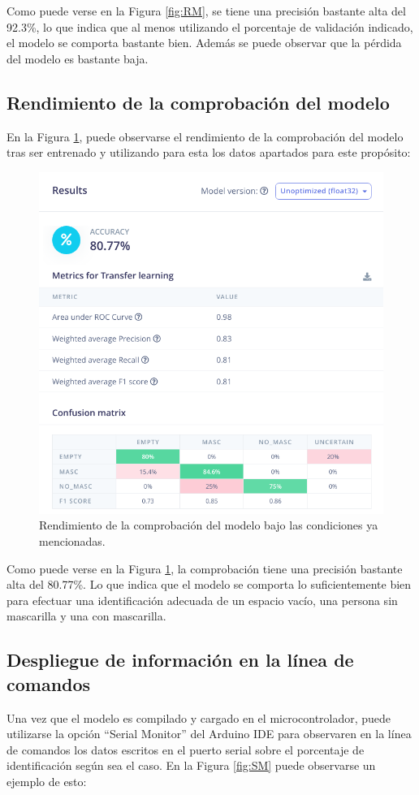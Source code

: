 Como puede verse en la Figura \ref{fig:RM}, se tiene una precisión bastante alta del 92.3\%, lo que indica que al menos utilizando el porcentaje de validación indicado, el modelo se comporta bastante bien. Además se puede observar que la pérdida del modelo es bastante baja. 

\subsection{Rendimiento de la comprobación del modelo}
En la Figura \ref{fig:TM}, puede observarse el rendimiento de la comprobación del modelo tras ser entrenado y utilizando para esta los datos apartados para este propósito: 

\begin{figure}[H]
\centering
\includegraphics[width=120mm]{./Figuras/Desarrollo_Analisis/TM}
\caption{Rendimiento de la comprobación del modelo bajo las condiciones ya mencionadas.} 
\label{fig:TM}
\end{figure}

Como puede verse en la Figura \ref{fig:TM}, la comprobación tiene una precisión bastante alta del 80.77\%. Lo que indica que el modelo se comporta lo suficientemente bien para efectuar una identificación adecuada de un espacio vacío, una persona sin mascarilla y una con mascarilla. 

\subsection{Despliegue de información en la línea de comandos}
Una vez que el modelo es compilado y cargado en el microcontrolador, puede utilizarse la opción ``Serial Monitor'' del Arduino IDE para observaren en la línea de comandos los datos escritos en el puerto serial sobre el porcentaje de identificación según sea el caso.  En la Figura \ref{fig:SM} puede observarse un ejemplo de esto:

